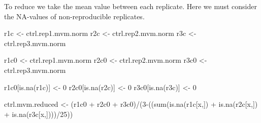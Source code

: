 \documentclass[
]{article}
\newenvironment{Shaded}{\begin{snugshade}}{\end{snugshade}}
\newcommand{\DecValTok}[1]{\textcolor[rgb]{0.00,0.00,0.81}{#1}}
\newcommand{\FunctionTok}[1]{\textcolor[rgb]{0.00,0.00,0.00}{#1}}
\newcommand{\NormalTok}[1]{#1}
\newcommand{\OtherTok}[1]{\textcolor[rgb]{0.56,0.35,0.01}{#1}}
\newcommand{\SpecialCharTok}[1]{\textcolor[rgb]{0.00,0.00,0.00}{#1}}
\begin{document}
To reduce we take the mean value between each replicate. Here we must
consider the NA-values of non-reproducible replicates.

\begin{Shaded}
\begin{Highlighting}[]
\NormalTok{r1c }\OtherTok{\textless{}{-}}\NormalTok{ ctrl.rep1.mvm.norm}
\NormalTok{r2c }\OtherTok{\textless{}{-}}\NormalTok{ ctrl.rep2.mvm.norm}
\NormalTok{r3c }\OtherTok{\textless{}{-}}\NormalTok{ ctrl.rep3.mvm.norm}

\NormalTok{r1c0 }\OtherTok{\textless{}{-}}\NormalTok{ ctrl.rep1.mvm.norm}
\NormalTok{r2c0 }\OtherTok{\textless{}{-}}\NormalTok{ ctrl.rep2.mvm.norm}
\NormalTok{r3c0 }\OtherTok{\textless{}{-}}\NormalTok{ ctrl.rep3.mvm.norm}

\NormalTok{r1c0[}\FunctionTok{is.na}\NormalTok{(r1c)] }\OtherTok{\textless{}{-}} \DecValTok{0}
\NormalTok{r2c0[}\FunctionTok{is.na}\NormalTok{(r2c)] }\OtherTok{\textless{}{-}} \DecValTok{0}
\NormalTok{r3c0[}\FunctionTok{is.na}\NormalTok{(r3c)] }\OtherTok{\textless{}{-}} \DecValTok{0}


\NormalTok{ctrl.mvm.reduced }\OtherTok{\textless{}{-}}\NormalTok{  (r1c0 }\SpecialCharTok{+}\NormalTok{ r2c0 }\SpecialCharTok{+}\NormalTok{ r3c0)}\SpecialCharTok{/}\NormalTok{(}\DecValTok{3}\SpecialCharTok{{-}}\NormalTok{((}\FunctionTok{sum}\NormalTok{(}\FunctionTok{is.na}\NormalTok{(r1c[x,]) }\SpecialCharTok{+} \FunctionTok{is.na}\NormalTok{(r2c[x,]) }\SpecialCharTok{+} \FunctionTok{is.na}\NormalTok{(r3c[x,])))}\SpecialCharTok{/}\DecValTok{25}\NormalTok{))}
\end{Highlighting}
\end{Shaded}
\end{document}
